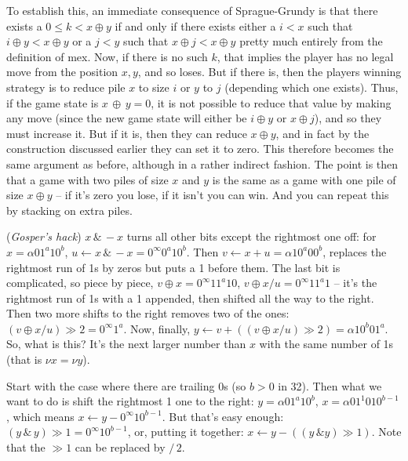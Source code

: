 To establish this, an immediate consequence of Sprague-Grundy is that
there exists a $0 \le k < x \oplus y$ if and only if there exists
either a $i < x$ such that $i \oplus y < x \oplus y$ or
a $j < y$ such that $x \oplus j < x \oplus y$ pretty much entirely from
the definition of mex.  Now, if there is no such $k$, that implies the
player has no legal move from the position $x, y$, and so loses.
But if there is, then the players winning strategy is to reduce pile $x$ to
size $i$ or $y$ to $j$ (depending which one exists).  Thus, if the game state is 
$x \, \oplus \, y = 0$, it is not possible to reduce that
value by making any move (since the new game state will either be 
$i \oplus y$ or $x \oplus j$), and so they must increase it.  But if it
is, then they can reduce $x \oplus y$, and in fact by the construction
discussed earlier they can set it to zero.  This therefore becomes the
same argument as before, although in a rather indirect fashion.
The point is then that a game with two piles of size $x$ and $y$ is
the same as a game with one pile of size $x \oplus y$ -- if it's zero
you lose, if it isn't you can win.  And you can repeat this by stacking
on extra piles.

\vskip 0.08in  ({\it Gosper's hack})\hfil\break
$x \, \& \, -x$ turns all other bits except the rightmost one off: for
$x = \alpha 0 1^a 1 0^b$, $u \gets x \, \& \, -x = 0^{\infty} 0^a 1 0^b$.
Then $v \gets x + u = \alpha 1 0^a 0 0^b$, replaces the rightmost
run of 1s by zeros but puts a 1 before them.  The last bit is complicated, so
piece by piece, $v \oplus x = 0^{\infty} 1 1^a 1 0$,
$v \oplus x / u = 0^{\infty} 1 1^a 1$ -- it's the rightmost run of 1s with a 1 appended,
then shifted all the way to the right.  Then two more shifts to the right removes
two of the ones: $\left(v \oplus x / u\right) \gg 2 = 0^{\infty} 1^a$.
Now, finally, $y \gets v + \left( \left(v \oplus x / u\right) \gg 2 \right)
= \alpha 1 0^{b} 0 1^a$.  So, what is this?  It's the next larger number than $x$
with the same number of 1s (that is $\nu x = \nu y$).

\vskip 0.08in  Start with the case where 
there are trailing 0s (so $b > 0$ in 32).  Then what we want to
do is shift the rightmost 1 one to the right: $y = \alpha 0 1^a 1 0^b$,
$x = \alpha 0 1^1 0 1 0^{b-1}$, which means $x \gets y -  0^{\infty} 1 0^{b-1}$.
But that's easy enough: $\left(y \, \& \,y\right) \gg 1 = 0^{\infty} 1 0^{b-1}$,
or, putting it together: $x \gets y - \left( \left(y \,\& y\right)  \gg 1 \right)$.
Note that the $\gg 1$ can be replaced by $ / \,2$.


